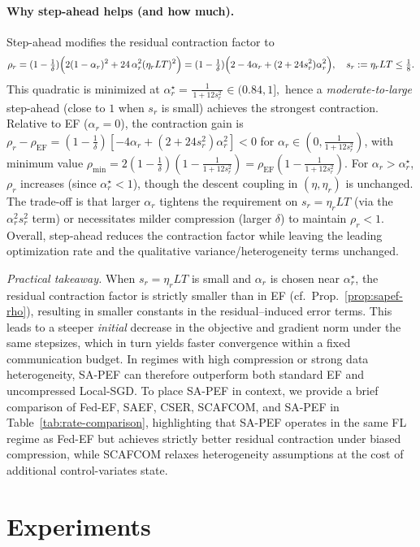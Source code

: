 \documentclass{article} %
\begin{document}
\paragraph{Why step-ahead helps (and how much).}
Step-ahead modifies the residual contraction factor to
\[
\rho_r
=(1-\tfrac1\delta)\Bigl(2(1-\alpha_r)^2+24\,\alpha_r^2(\eta_rLT)^2\Bigr)
=(1-\tfrac1\delta)\Bigl(2-4\alpha_r+(2+24s_r^2)\alpha_r^2\Bigr),
\quad s_r:=\eta_rLT\le\tfrac18.
\]
This quadratic is minimized at
\(
\alpha_r^\star=\frac{1}{\,1+12s_r^2\,}\in(0.84,1],
\)
hence a \emph{moderate-to-large} step-ahead (close to $1$ when $s_r$ is small) achieves the strongest contraction. Relative to EF ($\alpha_r=0$), the contraction gain is
\(
\rho_r-\rho_{\mathrm{EF}}
=(1-\tfrac1\delta)[-4\alpha_r+(2+24s_r^2)\alpha_r^2]<0
\)
for $\alpha_r\in(0,\tfrac{1}{1+12s_r^2})$, with minimum value
\(
\rho_{\min}
=2(1-\tfrac1\delta)(1-\frac{1}{1+12s_r^2})
=\rho_{\mathrm{EF}}(1-\frac{1}{1+12s_r^2}).
\)
For $\alpha_r>\alpha_r^\star$, $\rho_r$ increases (since $\alpha_r^\star<1$), though the descent coupling in $(\eta,\eta_r)$ is unchanged. The trade-off is that larger $\alpha_r$ tightens the requirement on $s_r=\eta_rLT$ (via the $\alpha_r^2 s_r^2$ term) or necessitates milder compression (larger $\delta$) to maintain $\rho_r<1$. Overall, step-ahead reduces the contraction factor while leaving the leading optimization rate and the qualitative variance/heterogeneity terms unchanged.

\noindent\emph{Practical takeaway.}
When $s_r=\eta_rLT$ is small and $\alpha_r$ is chosen near $\alpha_r^\star$, the residual contraction factor is strictly smaller than in EF (cf.\ Prop.~\ref{prop:sapef-rho}), resulting in smaller constants in the residual–induced error terms. This leads to a steeper \emph{initial} decrease in the objective and gradient norm under the same stepsizes, which in turn yields faster convergence within a fixed communication budget. In regimes with high compression or strong data heterogeneity, SA-PEF can therefore outperform both standard EF and uncompressed Local-SGD. To place SA-PEF in context, we provide a brief comparison of Fed-EF, SAEF, CSER, SCAFCOM, and SA-PEF in Table~\ref{tab:rate-comparison}, highlighting that SA-PEF operates in the same FL regime as Fed-EF but achieves strictly better residual contraction under biased compression, while SCAFCOM relaxes heterogeneity assumptions at the cost of additional control-variates state.


\section{Experiments}
\end{document}
